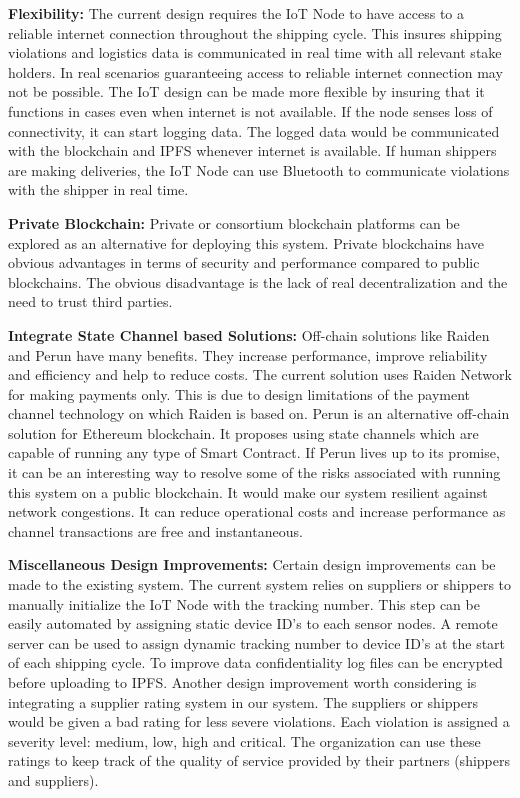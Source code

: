 \textbf{Flexibility:} The current design requires the IoT Node to have access to a reliable internet connection throughout the shipping cycle. This insures shipping violations and logistics data is communicated in real time with all relevant stake holders. In real scenarios guaranteeing access to reliable internet connection may not be possible. The IoT design can be made more flexible by insuring that it functions in cases even when internet is not available. If the node senses loss of connectivity, it can start logging data. The logged data would be communicated with the blockchain and IPFS whenever internet is available. If human shippers are making deliveries, the IoT Node can use Bluetooth to communicate violations with the shipper in real time. 

\textbf{Private Blockchain:} Private or consortium blockchain platforms can be explored as an alternative for deploying this system. Private blockchains have obvious advantages in terms of security and performance compared to public blockchains. The obvious disadvantage is the lack of real decentralization and the need to trust third parties. 

\textbf{Integrate State Channel based Solutions:} Off-chain solutions like Raiden and Perun have many benefits. They increase performance, improve reliability and efficiency and help to reduce costs. The current solution uses Raiden Network for making payments only. This is due to design limitations of the payment channel technology on which Raiden is based on. Perun is an alternative off-chain solution for Ethereum blockchain. It proposes using state channels which are capable of running any type of Smart Contract. If Perun lives up to its promise, it can be an interesting way to resolve some of the risks associated with running this system on a public blockchain. It would make our system resilient against network congestions. It can reduce operational costs and increase performance as channel transactions are free and instantaneous. 

\textbf{Miscellaneous Design Improvements:} 
Certain design improvements can be made to the existing system. The current system relies on suppliers or shippers to manually initialize the IoT Node with the tracking number. This step can be easily automated by assigning static device ID’s to each sensor nodes. A remote server can be used to assign dynamic tracking number to device ID’s at the start of each shipping cycle. To improve data confidentiality log files can be encrypted before uploading to IPFS. Another design improvement worth considering is integrating a supplier rating system in our system. The suppliers or shippers would be given a bad rating for less severe violations. Each violation is assigned a severity level: medium, low, high and critical. The organization can use these ratings to keep track of the quality of service provided by their partners (shippers and suppliers). 
